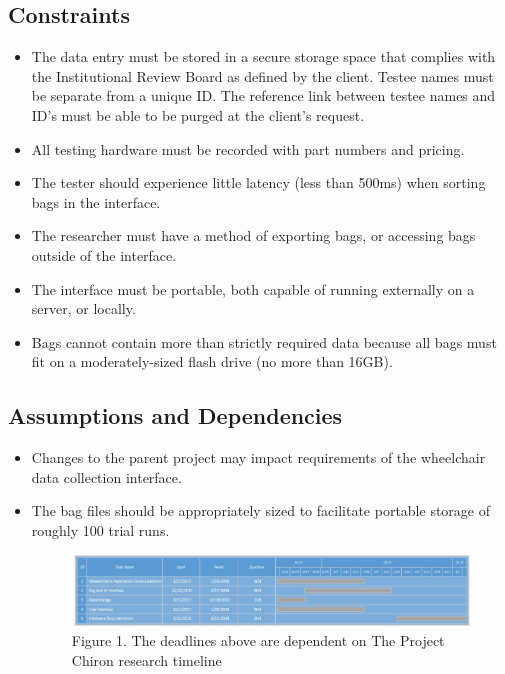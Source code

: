 \documentclass[onecolumn, draftclsnofoot,10pt, compsoc]{IEEEtran}
\begin{document}
\subsection{Constraints}
\begin{itemize}
	\item The data entry must be stored in a secure storage space that complies with the Institutional Review Board as defined by the client.
		\subitem Testee names must be separate from a unique ID.
		\subitem The reference link between testee names and ID's must be able to be purged at the client's request.
	\item All testing hardware must be recorded with part numbers and pricing.
	\item The tester should experience little latency (less than 500ms) when sorting bags in the interface.
	\item The researcher must have a method of exporting bags, or accessing bags outside of the interface.
	\item The interface must be portable, both capable of running externally on a server, or locally.
	\item Bags cannot contain more than strictly required data because all bags must fit on a moderately-sized flash drive (no more than 16GB).
\end{itemize}
\subsection{Assumptions and Dependencies}
\begin{itemize}
	\item Changes to the parent project may impact requirements of the wheelchair data collection interface.
	\item The bag files should be appropriately sized to facilitate portable storage of roughly 100 trial runs.
	\begin{figure}[h!]
		
		\centering
		\includegraphics[width=\linewidth, scale=0.7]{PrelimGanttChart.jpg}
		Figure 1. The deadlines above are dependent on The Project Chiron research timeline
	\end{figure}
	
\end{itemize}
\end{document}
